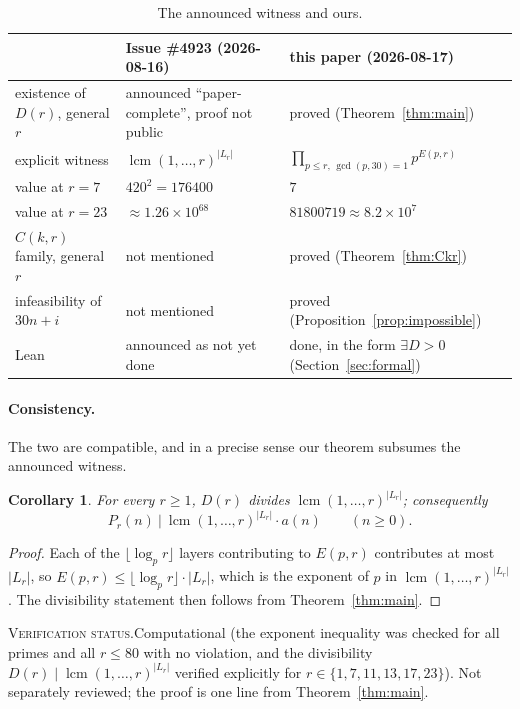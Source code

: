 \documentclass[11pt]{article}
\theoremstyle{plain}
\newtheorem{corollary}[theorem]{Corollary}
\theoremstyle{definition}
\theoremstyle{remark}
\numberwithin{equation}{section}
\newcommand{\Lr}{L_r}
\DeclareMathOperator{\lcm}{lcm}
\newcommand{\vstatus}[1]{%
  \par\vspace{3pt}\noindent
  {\small\textsc{Verification status.}\enspace #1}\par\vspace{3pt}}
\begin{document}
\begin{table}[ht]
\centering
\small
\begin{tabular}{@{}lll@{}}
\toprule
& Issue \#4923 (2026-08-16) & this paper (2026-08-17) \\
\midrule
existence of $D(r)$, general $r$ & announced ``paper-complete'', proof not public
  & proved (Theorem~\ref{thm:main}) \\
explicit witness & $\lcm(1,\dots,r)^{|\Lr|}$ & $\prod_{p\le r,\,\gcd(p,30)=1} p^{E(p,r)}$ \\
value at $r=7$ & $420^2 = 176400$ & $7$ \\
value at $r=23$ & $\approx 1.26\times10^{68}$ & $81800719 \approx 8.2\times 10^{7}$ \\
$C(k,r)$ family, general $r$ & not mentioned & proved (Theorem~\ref{thm:Ckr}) \\
infeasibility of $30n+i$ & not mentioned & proved (Proposition~\ref{prop:impossible}) \\
Lean & announced as not yet done & done, in the form $\exists D>0$ (Section~\ref{sec:formal}) \\
\bottomrule
\end{tabular}
\caption{The announced witness and ours.}
\label{tab:kitaken}
\end{table}

\paragraph{Consistency.} The two are compatible, and in a precise sense our theorem subsumes the
announced witness.

\begin{corollary}
\label{cor:lcm}
For every $r \ge 1$, $D(r)$ divides $\lcm(1,\dots,r)^{|\Lr|}$; consequently
\[
  P_r(n) \ \Big|\ \lcm(1,\dots,r)^{|\Lr|}\cdot a(n) \qquad (n \ge 0).
\]
\end{corollary}

\begin{proof}
Each of the $\lfloor \log_p r\rfloor$ layers contributing to $E(p,r)$ contributes at most
$|\Lr|$, so $E(p,r) \le \lfloor\log_p r\rfloor\cdot|\Lr|$, which is the exponent of $p$ in
$\lcm(1,\dots,r)^{|\Lr|}$. The divisibility statement then follows from
Theorem~\ref{thm:main}.
\end{proof}
\vstatus{Computational (the exponent inequality was checked for all primes and all $r \le 80$
with no violation, and the divisibility $D(r) \mid \lcm(1,\dots,r)^{|\Lr|}$ verified explicitly
for $r \in \{1,7,11,13,17,23\}$). Not separately reviewed; the proof is one line from
Theorem~\ref{thm:main}.}
\end{document}
